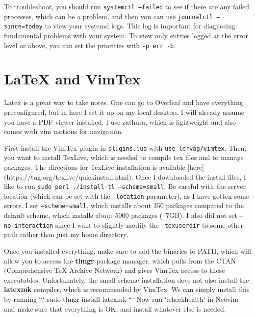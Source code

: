 \documentclass{article}
\begin{document}
    To troubleshoot, you should run \texttt{systemctl --failed} to see if there are any failed processes, which can be a problem, and then you can use \texttt{journalctl --since=today} to view your systemd logs. This log is important for diagnosing fundamental problems with your system. To view only entries logged at the error level or above, you can set the priorities with \texttt{-p err -b}. 

\section{LaTeX and VimTex} 

Latex is a great way to take notes. One can go to Overleaf and have everything preconfigured, but in here I set it up on my local desktop. I will already assume you have a PDF viewer installed. I use zathura, which is lightweight and also comes with vim motions for navigation. 

First install the VimTex plugin in \texttt{plugins.lua} with \texttt{use lervag/vimtex}. Then, you want to install TexLive, which is needed to compile tex files and to manage packages. The directions for TexLive installation is available [here](https://tug.org/texlive/quickinstall.html). Once I downloaded the install files, I like to run \texttt{sudo perl ./install-tl --scheme=small}. Be careful with the server location (which can be set with the \texttt{--location} parameter), as I have gotten some errors. I set \texttt{--scheme=small}, which installs about 350 packages compared to the default scheme, which installs about 5000 packages (~7GB). I also did not set \texttt{--no-interaction} since I want to slightly modify the \texttt{--texuserdir} to some other path rather than just my home directory. 

Once you installed everything, make sure to add the binaries to PATH, which will allow you to access the \textbf{tlmgr} package manager, which pulls from the CTAN (Comprehensive TeX Archive Network) and gives VimTex access to these executables. Unfortunately, the small scheme installation does not also install the \textbf{latexmk} compiler, which is recommended by VimTex. We can simply install this by running 
```
sudo tlmgr install latexmk
```
Now run `:checkhealth` in Neovim and make sure that everything is OK, and install whatever else is needed. 
\end{document}
